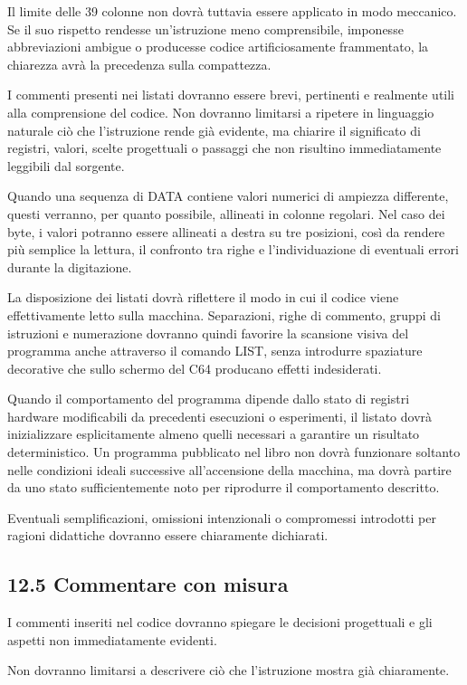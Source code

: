 \documentclass{article}
\begin{document}
Il limite delle 39 colonne non dovrà tuttavia essere applicato in modo meccanico. Se il suo rispetto rendesse
un'istruzione meno comprensibile, imponesse abbreviazioni ambigue o producesse codice artificiosamente frammentato, la
chiarezza avrà la precedenza sulla compattezza.

I commenti presenti nei listati dovranno essere brevi, pertinenti e realmente utili alla comprensione del codice. Non
dovranno limitarsi a ripetere in linguaggio naturale ciò che l'istruzione rende già evidente, ma chiarire il
significato di registri, valori, scelte progettuali o passaggi che non risultino immediatamente leggibili dal sorgente.

Quando una sequenza di DATA contiene valori numerici di ampiezza differente, questi verranno, per quanto possibile,
allineati in colonne regolari. Nel caso dei byte, i valori potranno essere allineati a destra su tre posizioni, così da
rendere più semplice la lettura, il confronto tra righe e l'individuazione di eventuali errori durante la digitazione.

La disposizione dei listati dovrà riflettere il modo in cui il codice viene effettivamente letto sulla macchina.
Separazioni, righe di commento, gruppi di istruzioni e numerazione dovranno quindi favorire la scansione visiva del
programma anche attraverso il comando LIST, senza introdurre spaziature decorative che sullo schermo del C64 producano
effetti indesiderati.

Quando il comportamento del programma dipende dallo stato di registri hardware modificabili da precedenti esecuzioni o
esperimenti, il listato dovrà inizializzare esplicitamente almeno quelli necessari a garantire un risultato
deterministico. Un programma pubblicato nel libro non dovrà funzionare soltanto nelle condizioni ideali successive
all'accensione della macchina, ma dovrà partire da uno stato sufficientemente noto per riprodurre il comportamento
descritto.

Eventuali semplificazioni, omissioni intenzionali o compromessi introdotti per ragioni didattiche dovranno essere
chiaramente dichiarati.

\subsection{12.5 Commentare con misura}
I commenti inseriti nel codice dovranno spiegare le decisioni progettuali e gli aspetti non immediatamente evidenti.

Non dovranno limitarsi a descrivere ciò che l'istruzione mostra già chiaramente.
\end{document}
